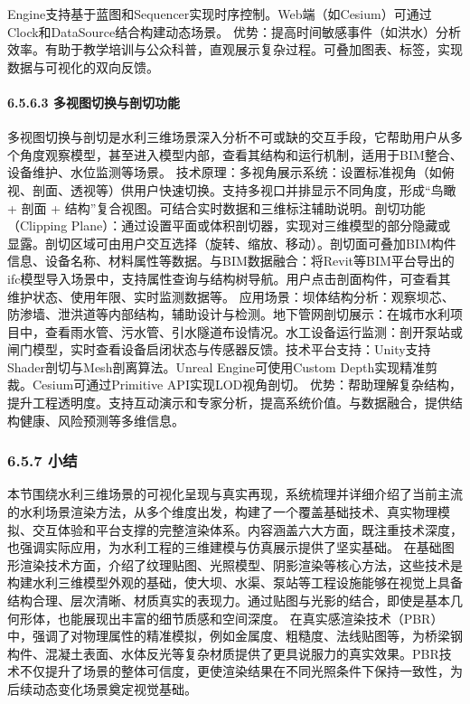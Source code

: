 {{{{{{{{{{Engine支持基于蓝图和Sequencer实现时序控制。Web端（如Cesium）可通过Clock和DataSource结合构建动态场景。
优势：提高时间敏感事件（如洪水）分析效率。有助于教学培训与公众科普，直观展示复杂过程。可叠加图表、标签，实现数据与可视化的双向反馈。 \paragraph{6.5.6.3
多视图切换与剖切功能}\label{ux591aux89c6ux56feux5207ux6362ux4e0eux5256ux5207ux529fux80fd}
多视图切换与剖切是水利三维场景深入分析不可或缺的交互手段，它帮助用户从多个角度观察模型，甚至进入模型内部，查看其结构和运行机制，适用于BIM整合、设备维护、水位监测等场景。
技术原理：多视角展示系统：设置标准视角（如俯视、剖面、透视等）供用户快速切换。支持多视口并排显示不同角度，形成``鸟瞰 + 剖面 + 结构''复合视图。可结合实时数据和三维标注辅助说明。剖切功能（Clipping
Plane）：通过设置平面或体积剖切器，实现对三维模型的部分隐藏或显露。剖切区域可由用户交互选择（旋转、缩放、移动）。剖切面可叠加BIM构件信息、设备名称、材料属性等数据。与BIM数据融合：将Revit等BIM平台导出的ifc模型导入场景中，支持属性查询与结构树导航。用户点击剖面构件，可查看其维护状态、使用年限、实时监测数据等。
应用场景：坝体结构分析：观察坝芯、防渗墙、泄洪道等内部结构，辅助设计与检测。地下管网剖切展示：在城市水利项目中，查看雨水管、污水管、引水隧道布设情况。水工设备运行监测：剖开泵站或闸门模型，实时查看设备启闭状态与传感器反馈。技术平台支持：Unity支持Shader剖切与Mesh剖离算法。Unreal
Engine可使用Custom Depth实现精准剪裁。Cesium可通过Primitive API实现LOD视角剖切。
优势：帮助理解复杂结构，提升工程透明度。支持互动演示和专家分析，提高系统价值。与数据融合，提供结构健康、风险预测等多维信息。 \subsubsection{6.5.7 小结}\label{ux5c0fux7ed3-4}
本节围绕水利三维场景的可视化呈现与真实再现，系统梳理并详细介绍了当前主流的水利场景渲染方法，从多个维度出发，构建了一个覆盖基础技术、真实物理模拟、交互体验和平台支撑的完整渲染体系。内容涵盖六大方面，既注重技术深度，也强调实际应用，为水利工程的三维建模与仿真展示提供了坚实基础。
在基础图形渲染技术方面，介绍了纹理贴图、光照模型、阴影渲染等核心方法，这些技术是构建水利三维模型外观的基础，使大坝、水渠、泵站等工程设施能够在视觉上具备结构合理、层次清晰、材质真实的表现力。通过贴图与光影的结合，即使是基本几何形体，也能展现出丰富的细节质感和空间深度。
在真实感渲染技术（PBR）中，强调了对物理属性的精准模拟，例如金属度、粗糙度、法线贴图等，为桥梁钢构件、混凝土表面、水体反光等复杂材质提供了更具说服力的真实效果。PBR技术不仅提升了场景的整体可信度，更使渲染结果在不同光照条件下保持一致性，为后续动态变化场景奠定视觉基础。
}}}}}}}}}}
